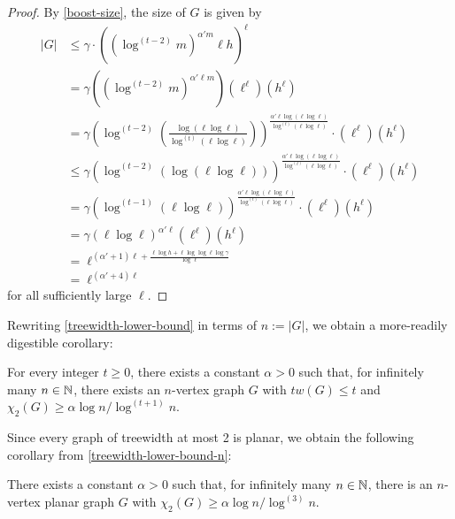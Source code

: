 \documentclass[kpfonts]{patmorin}
\newcommand{\uqs}{\chi_2}
\theoremstyle{named}
\begin{document}
\begin{proof}
   By \cref{boost-size}, the size of $G$ is given by
   \begin{align*}
        |G| & \le \gamma\cdot \left((\log^{(t-2)}m)^{\alpha' m}\ell h\right)^\ell \\
        & = \gamma ((\log^{(t-2)}m)^{\alpha'\ell m}) (\ell^\ell) (h^\ell) \\
        & = \gamma \left(\log^{(t-2)}\left(\frac{\log(\ell\log\ell)}{\log^{(t)}(\ell\log\ell)}\right)\right)
        ^{\frac{\alpha'\ell\log(\ell\log\ell)}{\log^{(t)}(\ell\log\ell)}} \cdot (\ell^\ell) (h^\ell) \\
        & \le \gamma \left(\log^{(t-2)}(\log(\ell\log\ell))\right)
        ^{\frac{\alpha'\ell\log(\ell\log\ell)}{\log^{(t)}(\ell\log\ell)}} \cdot (\ell^\ell) (h^\ell) \\
        & = \gamma \left(\log^{(t-1)}(\ell\log\ell)\right)
        ^{\frac{\alpha'\ell\log(\ell\log\ell)}{\log^{(t)}(\ell\log\ell)}} \cdot (\ell^\ell) (h^\ell) \\
        & = \gamma (\ell\log\ell)^{\alpha'\ell} (\ell^\ell) (h^\ell) \\
        & = \ell^{(\alpha'+1)\ell + \frac{\ell\log h + \ell\log\log\ell \log\gamma}{\log\ell}} \\
        & = \ell^{(\alpha'+4)\ell}
   \end{align*}
   for all sufficiently large $\ell$.
\end{proof}

Rewriting \cref{treewidth-lower-bound} in terms of $n:=|G|$, we obtain a more-readily digestible corollary:

\begin{cor}\label{treewidth-lower-bound-n}
    For every integer $t\ge 0$, there exists a constant $\alpha>0$ such that, for infinitely many $n\in\mathbb{N}$,   there exists an $n$-vertex graph $G$ with $tw(G)\le t$ and  $\uqs(G)\ge \alpha\log n/\log^{(t+1)} n$.
\end{cor}

Since every graph of treewidth at most 2 is planar, we obtain the following corollary from \cref{treewidth-lower-bound-n}:

\begin{cor}\label{planar-lower-bound}
    There exists a constant $\alpha>0$ such that, for infinitely many $n\in\mathbb{N}$, there is an $n$-vertex planar graph $G$ with $\uqs(G)\ge \alpha\log n/\log^{(3)} n$.
\end{cor}
\end{document}
